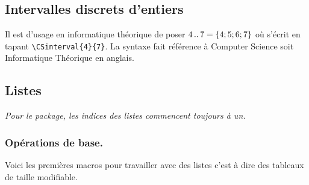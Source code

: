 \documentclass[12pt,a4paper]{article}
\theoremstyle{definition}
\newenvironment{frame-gene}[1][]{
	\begin{tcolorbox}[
		title        = #1, 
		colbacktitle = black!10!white, 
		colback      = white, 
		coltitle     = black,
		fonttitle    = \bfseries\itshape\small, 
		breakable,
		center title]
}{
	\end{tcolorbox}
}
\begin{document}

\subsection{Intervalles discrets d'entiers}

Il est d'usage en informatique théorique de poser $4\,.\mkern0.2mu.\,7 = \{ 4 ; 5 ; 6 ; 7 \}$ où  s'écrit en tapant \verb+\CSinterval{4}{7}+. La syntaxe fait référence à \og Computer Science \fg{} soit \og Informatique Théorique \fg{} en anglais.





\subsection{Listes}

\begin{frame-gene}
	\centering\itshape
	Pour le package, les indices des listes commencent toujours à un. 
\end{frame-gene}


\subsubsection{Opérations de base.}

Voici les premières macros pour travailler avec des listes c'est à dire des tableaux de taille modifiable.
\end{document}

